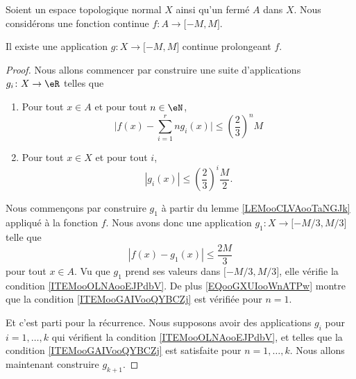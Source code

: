 \begin{lemma}     \label{LEMooSKSNooEdgFcR}
	Soient un espace topologique normal \( X\) ainsi qu'un fermé \( A\) dans \( X\). Nous considérons une fonction continue \( f\colon A\to \mathopen[ -M , M \mathclose]\).

	Il existe une application \( g\colon X\to \mathopen[ -M , M \mathclose]\) continue prolongeant \( f\).
\end{lemma}

\begin{proof}
	Nous allons commencer par construire une suite d'applications \( g_i\colon X\to \eR\) telles que
	\begin{enumerate}
		\item       \label{ITEMooGAIVooQYBCZj}
		      Pour tout \( x\in A\) et pour tout \(n\in \eN\),
		      \begin{equation}
			      \big| f(x)-\sum_{i=1}^rng_i(x) \big|\leq \left( \frac{ 2 }{ 3 } \right)^nM
		      \end{equation}
		\item       \label{ITEMooOLNAooEJPdbV}
		      Pour tout \( x\in X\) et pour tout \( i\),
		      \begin{equation}
			      | g_i(x) |\leq \left( \frac{ 2 }{ 3 } \right)^i\frac{ M }{2}.
		      \end{equation}
	\end{enumerate}
	Nous commençons par construire \( g_1\) à partir du lemme \ref{LEMooCLVAooTaNGJk} appliqué à la fonction \( f\). Nous avons donc une application \( g_1\colon X\to \mathopen[ -M/3 , M/3 \mathclose]\) telle que
	\begin{equation}        \label{EQooGXUIooWnATPw}
		| f(x)-g_1(x) |\leq \frac{ 2M }{ 3 }
	\end{equation}
	pour tout \( x\in A\). Vu que \( g_1\) prend ses valeurs dans \( \mathopen[ -M/3 , M/3 \mathclose]\), elle vérifie la condition \ref{ITEMooOLNAooEJPdbV}. De plus \eqref{EQooGXUIooWnATPw} montre que la condition \ref{ITEMooGAIVooQYBCZj} est vérifiée pour \( n=1\).

	Et c'est parti pour la récurrence. Nous supposons avoir des applications \( g_i\) pour \( i=1,\ldots, k\) qui vérifient la condition \ref{ITEMooOLNAooEJPdbV}, et telles que la condition \ref{ITEMooGAIVooQYBCZj} est satisfaite pour \(  n=1,\ldots, k\). Nous allons maintenant construire \( g_{k+1}\).


\end{proof}

